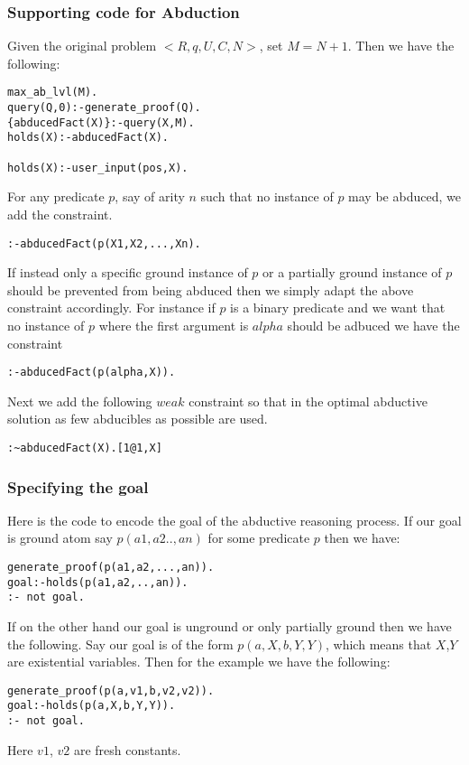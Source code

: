 \documentclass{article}
\begin{document}
\subsubsection{Supporting code for Abduction} 
Given the original problem $<R,q,U,C,N>$, set $M=N+1$. Then we have the following: 
\begin{verbatim}
max_ab_lvl(M).
query(Q,0):-generate_proof(Q).
{abducedFact(X)}:-query(X,M).
holds(X):-abducedFact(X).

holds(X):-user_input(pos,X).
\end{verbatim}
For any predicate $p$, say of arity $n$ such that no instance of $p$ may be abduced, we add the constraint.
\begin{verbatim} 
:-abducedFact(p(X1,X2,...,Xn).
\end{verbatim}
If instead only a specific ground instance of $p$ or a partially ground instance of $p$ should be prevented from being abduced then we simply adapt the above constraint accordingly. For instance if $p$ is a binary predicate and we want that no instance of $p$ where the first argument is $alpha$ should be adbuced we have the constraint
\begin{verbatim} 
:-abducedFact(p(alpha,X)).
\end{verbatim}
Next we add the following $weak$ constraint so that in the optimal abductive solution as few abducibles as possible are used.
\begin{verbatim} 
:~abducedFact(X).[1@1,X]
\end{verbatim}
\subsubsection{Specifying the goal}
Here is the code to encode the goal of the abductive reasoning process. If our goal is ground atom say $p(a1,a2..,an)$ for some predicate $p$ then we have:
\begin{verbatim}
generate_proof(p(a1,a2,...,an)).
goal:-holds(p(a1,a2,..,an)).
:- not goal.
\end{verbatim}
If on the other hand our goal is unground or only partially ground then we have the following. Say our goal is of the form $p(a,X,b,Y,Y)$, which means that $X$,$Y$ are existential variables. Then for the example we have the following:
\begin{verbatim}
generate_proof(p(a,v1,b,v2,v2)).
goal:-holds(p(a,X,b,Y,Y)).
:- not goal.
\end{verbatim}
Here $v1$, $v2$ are fresh constants.
\end{document}
